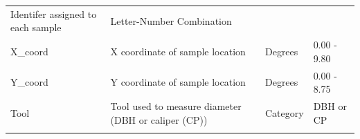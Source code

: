 \documentclass[
  12pt,
]{article}
\begin{document}
\begin{longtable}[]{@{}llll@{}}
\begin{minipage}[t]{0.35\columnwidth}
Identifer assigned to each sample\strut
\end{minipage} & \begin{minipage}[t]{0.18\columnwidth}\raggedright
Letter-Number Combination\strut
\end{minipage} & \begin{minipage}[t]{0.18\columnwidth}\raggedright
\strut
\end{minipage}\tabularnewline
\begin{minipage}[t]{0.18\columnwidth}\raggedright
X\_coord\strut
\end{minipage} & \begin{minipage}[t]{0.35\columnwidth}\raggedright
X coordinate of sample location\strut
\end{minipage} & \begin{minipage}[t]{0.18\columnwidth}\raggedright
Degrees\strut
\end{minipage} & \begin{minipage}[t]{0.18\columnwidth}\raggedright
0.00 - 9.80\strut
\end{minipage}\tabularnewline
\begin{minipage}[t]{0.18\columnwidth}\raggedright
Y\_coord\strut
\end{minipage} & \begin{minipage}[t]{0.35\columnwidth}\raggedright
Y coordinate of sample location\strut
\end{minipage} & \begin{minipage}[t]{0.18\columnwidth}\raggedright
Degrees\strut
\end{minipage} & \begin{minipage}[t]{0.18\columnwidth}\raggedright
0.00 - 8.75\strut
\end{minipage}\tabularnewline
\begin{minipage}[t]{0.18\columnwidth}\raggedright
Tool\strut
\end{minipage} & \begin{minipage}[t]{0.35\columnwidth}\raggedright
Tool used to measure diameter (DBH or caliper (CP))\strut
\end{minipage} & \begin{minipage}[t]{0.18\columnwidth}\raggedright
Category\strut
\end{minipage} & \begin{minipage}[t]{0.18\columnwidth}\raggedright
DBH or CP\strut
\end{minipage}\tabularnewline
\begin{minipage}[t]{0.18\columnwidth}\raggedright

\end{minipage}
\end{longtable}
\end{document}
